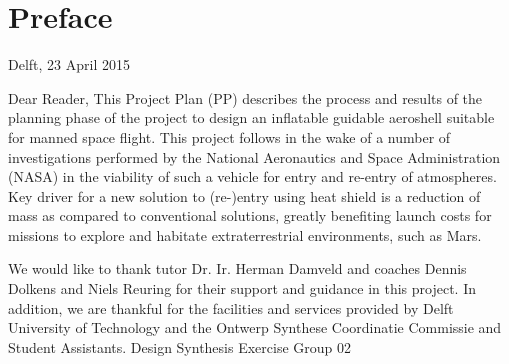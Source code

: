 \section*{Preface}\label{cha:preface}

\begin{flushright}
Delft, 23 April 2015
\end{flushright}

Dear Reader,	
\newline
\newline
\newline
This Project Plan (PP) describes the process and results of the planning phase of the project to design an inflatable guidable aeroshell suitable for manned space flight. This project follows in the wake of a number of investigations performed by the National Aeronautics and Space Administration (NASA) in the viability of such a vehicle for entry and re-entry of atmospheres. Key driver for a new solution to (re-)entry using heat shield is a reduction of mass as compared to conventional solutions, greatly benefiting launch costs for missions to explore and habitate extraterrestrial environments, such as Mars. 

We would like to thank tutor Dr. Ir. Herman Damveld and coaches Dennis Dolkens and Niels Reuring for their support and guidance in this project. In addition, we are thankful for the facilities and services provided by Delft University of Technology and the Ontwerp Synthese Coordinatie Commissie and Student Assistants.
\newline
\newline
\newline
\newline
Design Synthesis Exercise Group 02